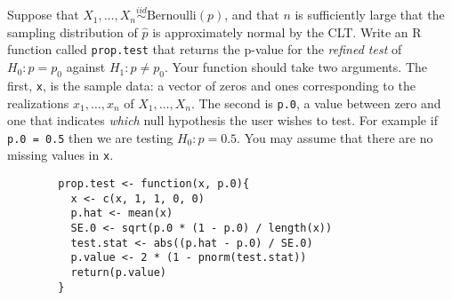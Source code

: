 \documentclass[addpoints,12pt]{exam}
\begin{document}
\begin{questions}


\question[20] Suppose that $X_1, \hdots, X_n \overset{iid}{\sim} \mbox{Bernoulli}(p)$, and that $n$ is sufficiently large that the sampling distribution of $\widehat{p}$ is approximately normal by the CLT. Write an R function called \texttt{prop.test} that returns the p-value for the \emph{refined test} of $H_0\colon p = p_0$ against $H_1 \colon p \neq p_0$. Your function should take two arguments. The first, \texttt{x}, is the sample data: a vector of zeros and ones corresponding to the realizations $x_1, \hdots, x_n$ of $X_1, \hdots, X_n$. The second is \texttt{p.0}, a value between zero and one that indicates \emph{which} null hypothesis the user wishes to test. For example if \texttt{p.0 = 0.5} then we are testing $H_0\colon p = 0.5$. You may assume that there are no missing values in \texttt{x}.
\begin{solution}[6cm]
	\begin{verbatim}
		prop.test <- function(x, p.0){
		  x <- c(x, 1, 1, 0, 0)
		  p.hat <- mean(x)
		  SE.0 <- sqrt(p.0 * (1 - p.0) / length(x))
		  test.stat <- abs((p.hat - p.0) / SE.0)
		  p.value <- 2 * (1 - pnorm(test.stat))
		  return(p.value)
		}
	\end{verbatim}
\end{solution}



\end{questions}
\end{document}
